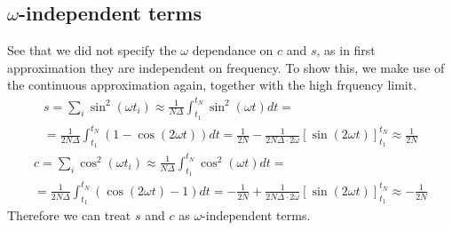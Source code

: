 \documentclass[a4paper,11pt,fleqn]{article}
\begin{document}
\subsection{$\omega$-independent terms}
See that we did not specify the $\omega$ dependance on $c$ and $s$, as 
in first approximation they are independent on frequency. To show this, 
we make use of the continuous approximation again, together with the high 
frquency limit. 
\begin{gather*}
    s = \sum_i \sin^2(\omega t_i)\approx \frac{1}{N\Delta}\int_{t_1}^{t_N} \sin^2(\omega t)dt =\\
    = \frac{1}{2N\Delta} \int_{t_1}^{t_N}(1-\cos(2\omega t))dt = \frac{1}{2N}-\frac{1}{2N \Delta \cdot 2\omega}[\sin(2\omega t)]_{t_1}^{t_N}\approx \frac{1}{2N}
\end{gather*}
\begin{gather*}
    c = \sum_i \cos^2(\omega t_i)\approx \frac{1}{N\Delta}\int_{t_1}^{t_N} \cos^2(\omega t)dt =\\
    = \frac{1}{2N\Delta} \int_{t_1}^{t_N}(\cos(2\omega t)-1)dt = -\frac{1}{2N}+\frac{1}{2N \Delta \cdot 2\omega}[\sin(2\omega t)]_{t_1}^{t_N}\approx -\frac{1}{2N}
\end{gather*}
Therefore we can treat $s$ and $c$ as $\omega$-independent terms.
\end{document}
